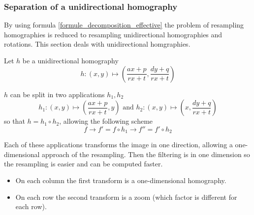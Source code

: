 \subsubsection{Separation of a unidirectional homography}

By using formula \ref{formule_decomposition_effective} the problem of resampling homographies is reduced to resampling unidirectional homographies and rotations. This section deals with unidirectional homgraphies.



\label{homobox_paragraph}


Let $h$ be a unidirectional homography 
\begin{equation*}
h:(x,y)\mapsto \left(\frac{ax+p}{rx+t},\frac{dy+q}{rx+t}\right)
\end{equation*}

$h$ can be split in two applications $h_1 , h_2$
\begin{equation*}
h_1:(x,y) \mapsto \left(\frac{ax+p}{rx+t},y\right) \text{ and } h_2:(x,y) \mapsto \left(x,\frac{dy+q}{rx+t}\right)
\end{equation*}
so that $h=h_1  \circ h_2$, allowing the following scheme
\begin{equation*}
f\longrightarrow f'=f\circ h_1 \longrightarrow f''=f'\circ h_2
\end{equation*}

Each of these applications transforms the image in one direction, allowing a one-dimensional approach of the resampling. Then the filtering is in one dimension so the resampling is easier and can be computed faster.

\begin{itemize}
\item On each column the first transform is a one-dimensional homography.%
\item On each row the second transform is a zoom (which factor is different for each row).%
\end{itemize}


